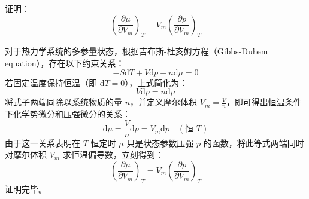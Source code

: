 \begin{exercise}\label{ex:12.12}
证明：
$$ \left(\frac{\partial \mu}{\partial V_m}\right)_T = V_m \left(\frac{\partial p}{\partial V_m}\right)_T $$
\end{exercise}
\begin{solution}
对于热力学系统的多参量状态，根据吉布斯-杜亥姆方程（Gibbs-Duhem equation），存在以下约束关系：
$$ -S \mathrm{d}T + V \mathrm{d}p - n \mathrm{d}\mu = 0 $$
若固定温度保持恒温（即 $\mathrm{d}T = 0$），上式简化为：
$$ V \mathrm{d}p = n \mathrm{d}\mu $$
将式子两端同除以系统物质的量 $n$，并定义摩尔体积 $V_m = \frac{V}{n}$，即可得出恒温条件下化学势微分和压强微分的关系：
$$ \mathrm{d}\mu = \frac{V}{n} \mathrm{d}p = V_m \mathrm{d}p \quad (\text{恒 } T) $$
由于这一关系表明在 $T$ 恒定时 $\mu$ 只是状态参数压强 $p$ 的函数，将此等式两端同时对摩尔体积 $V_m$ 求恒温偏导数，立刻得到：
$$ \left(\frac{\partial \mu}{\partial V_m}\right)_T = V_m \left(\frac{\partial p}{\partial V_m}\right)_T $$
证明完毕。
\end{solution}

